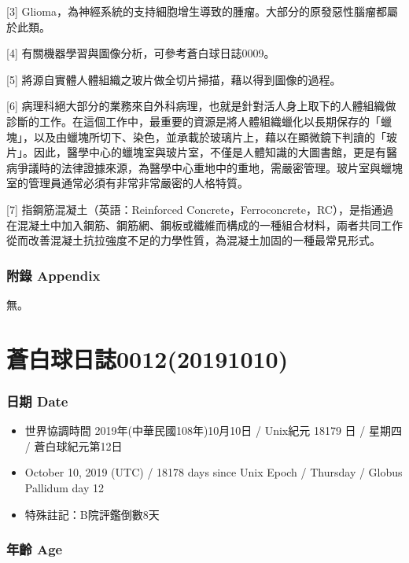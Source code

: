 \documentclass[a5paper, 12pt
]{book}
\providecommand{\tightlist}{%
  \setlength{\itemsep}{0pt}\setlength{\parskip}{0pt}}
\begin{document}
{[}3{]}
Glioma，為神經系統的支持細胞增生導致的腫瘤。大部分的原發惡性腦瘤都屬於此類。

{[}4{]} 有關機器學習與圖像分析，可參考蒼白球日誌0009。

{[}5{]} 將源自實體人體組織之玻片做全切片掃描，藉以得到圖像的過程。

{[}6{]}
病理科絕大部分的業務來自外科病理，也就是針對活人身上取下的人體組織做診斷的工作。在這個工作中，最重要的資源是將人體組織蠟化以長期保存的「蠟塊」，以及由蠟塊所切下、染色，並承載於玻璃片上，藉以在顯微鏡下判讀的「玻片」。因此，醫學中心的蠟塊室與玻片室，不僅是人體知識的大圖書館，更是有醫病爭議時的法律證據來源，為醫學中心重地中的重地，需嚴密管理。玻片室與蠟塊室的管理員通常必須有非常非常嚴密的人格特質。

{[}7{]} 指鋼筋混凝土（英語：Reinforced
Concrete，Ferroconcrete，RC），是指通過在混凝土中加入鋼筋、鋼筋網、鋼板或纖維而構成的一種組合材料，兩者共同工作從而改善混凝土抗拉強度不足的力學性質，為混凝土加固的一種最常見形式。

\hypertarget{ux9644ux9304-appendix-4}{%
\subsubsection{附錄 Appendix}\label{ux9644ux9304-appendix-4}}

無。

\hypertarget{ux84bcux767dux7403ux65e5ux8a8c001220191010}{%
\section{蒼白球日誌0012(20191010)}\label{ux84bcux767dux7403ux65e5ux8a8c001220191010}}

\hypertarget{ux65e5ux671f-date-9}{%
\subsubsection{日期 Date}\label{ux65e5ux671f-date-9}}

\begin{itemize}
\tightlist
\item
  世界協調時間 2019年(中華民國108年)10月10日 / Unix紀元 18179 日 /
  星期四 / 蒼白球紀元第12日
\item
  October 10, 2019 (UTC) / 18178 days since Unix Epoch / Thursday /
  Globus Pallidum day 12
\item
  特殊註記：B院評鑑倒數8天
\end{itemize}

\hypertarget{ux5e74ux9f61-age-9}{%
\subsubsection{年齡 Age}\label{ux5e74ux9f61-age-9}}
\end{document}
